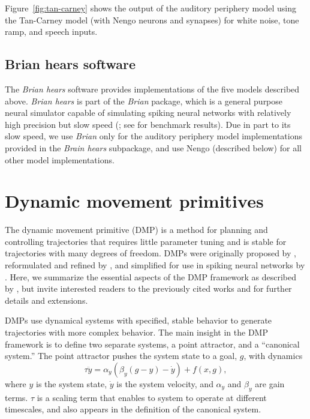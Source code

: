 Figure~\ref{fig:tan-carney} shows the output
of the auditory periphery model
using the Tan-Carney model
(with Nengo neurons and synapses)
for white noise, tone ramp, and speech inputs.


\subsection{Brian hears software}
\label{sec:brian-hears}

The \textit{Brian hears} software
\citep{fontaine2011}
provides implementations
of the five models described above.
\textit{Brian hears} is part of the
\textit{Brian} package,
which is a general purpose
neural simulator capable
of simulating spiking neural networks
with relatively high precision
but slow speed
(\citealp{goodman2008};
see \citealt{bekolay2013} for benchmark results).
Due in part to its slow speed,
we use \textit{Brian} only for
the auditory periphery model implementations
provided in the \textit{Brain hears} subpackage,
and use Nengo (described below)
for all other model implementations.

\section{Dynamic movement primitives}
\label{sec:methods-dmp}

The dynamic movement primitive (DMP)
is a method for planning and controlling trajectories
that requires little parameter tuning
and is stable for trajectories
with many degrees of freedom.
DMPs were originally proposed
by \citet{schaal2005,schaal2006},
reformulated and refined by \citet{ijspeert2007},
and simplified for use in spiking neural networks
by \citet{dewolf2015}.
Here, we summarize the essential aspects
of the DMP framework as described by \citet{dewolf2015},
but invite interested readers to
the previously cited works
and \citet{vijayakumar2005,ijspeert2013}
for further details and extensions.

DMPs use dynamical systems
with specified, stable behavior
to generate trajectories
with more complex behavior.
The main insight in the DMP framework
is to define two separate systems,
a point attractor,
and a ``canonical system.''
The point attractor pushes
the system state to
a goal, $g$, with dynamics
\begin{equation}
  \label{dmp-pointattractor}
  \tau\ddot{y} = \alpha_y(\beta_y(g - y) - \dot{y}) + f(x, g),
\end{equation}
where $y$ is the system state,
$\dot{y}$ is the system velocity,
and $\alpha_y$ and $\beta_y$ are gain terms.
$\tau$ is a scaling term
that enables to system to operate
at different timescales,
and also appears in the definition
of the canonical system.

